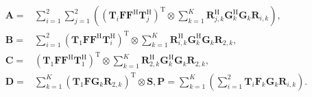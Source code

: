 \documentclass[journal]{IEEEtran}
\begin{document}
     \begin{equation}\begin{aligned}
     \mathbf{A}=&\sum _{i = 1}^{2}\sum _{j = 1}^{2}((\mathbf {T}_{i} {\mathbf{F}}{\mathbf{F}}^{\mathrm {H}}\mathbf {T}_{j}^{\mathrm{H}})^{\mathrm {T}} \otimes\sum _{k = 1}^{K}\mathbf {R}_{j,k}^{\mathrm{H}}\mathbf {G}_{k}^{\mathrm{H}}\mathbf{G}_{k}\mathbf {R}_{i,k}),
 \\\mathbf{B}=&\sum _{i = 1}^{2}(\mathbf {T}_{1} {\mathbf{F}}{\mathbf{F}}^{\mathrm {H}}\mathbf {T}_{i}^{\mathrm{H}})^{\mathrm {T}} \otimes\sum _{k = 1}^{K}\mathbf {R}_{i,k}^{\mathrm{H}}\mathbf {G}_{k}^{\mathrm{H}}\mathbf{G}_{k}\mathbf {R}_{2,k}, 
 \\\mathbf{C}=&(\mathbf {T}_{1} {\mathbf{F}}{\mathbf{F}}^{\mathrm {H}}\mathbf {T}_{1}^{\mathrm{H}})^{\mathrm {T}} \otimes\sum _{k = 1}^{K}\mathbf {R}_{2,k}^{\mathrm{H}}\mathbf {G}_{k}^{\mathrm{H}}\mathbf{G}_{k}\mathbf {R}_{2,k},
 \\\mathbf{D}=& \sum _{k = 1}^{K}(\mathbf {T}_{1}\mathbf {F}\mathbf {G}_{k}\mathbf {R}_{2,k})^{\mathrm{\!T}}\otimes\mathbf{S}, 
 \mathbf{P}=\sum _{k = 1}^{K}(\sum _{i = 1}^{2}\mathbf {T}_{i} {\mathbf{F}_{k}}\mathbf{G}_{k}\mathbf {R}_{i,k}).
 \end{aligned}\end{equation}
 
\end{document}
